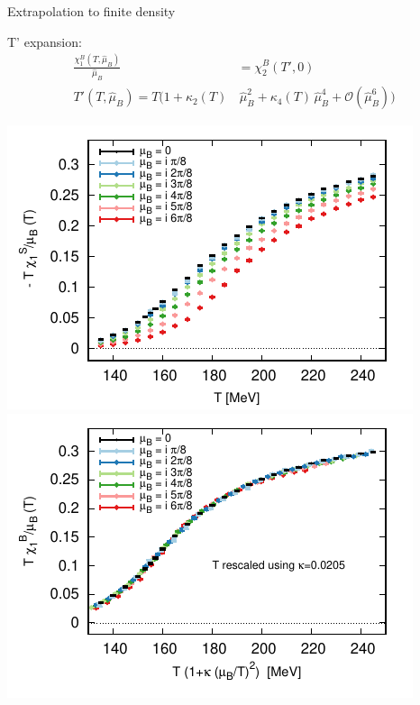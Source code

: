 \begin{frame}[fragile]{Extrapolation to finite density}
    \vspace{-0.2cm}
    \begin{block}{T' expansion:}
    \vspace{-0.2cm}
        \begin{align}
            \frac{\chi^B_1(T,\hat{\mu}_B)}{\hat{\mu}_B}&=\chi^B_2(T',0)\\
            T'(T,\hat{\mu}_B)=T\Big(1+\kappa_2(T)&\,\hat{\mu}_B^2+\kappa_4(T)\,\hat{\mu}_B^4+\mathcal{O}(\hat{\mu}_B^6)\Big)
        \end{align}
    \end{block}
    \vspace{0cm}
    \includegraphics[width=0.47\linewidth,trim={0 0 0 0.28cm}, clip]{Images/Figures/shift_48x12_BS.pdf}\hspace{0.5cm}\includegraphics[width=0.48\linewidth,trim={0 0 0 0}, clip]{Images/Figures/shift_48x12_B2_collapse.pdf}\\
    \vspace{-0.3cm}{\centering \scriptsize Phys. Rev. Lett. 126, 232001 (2021) \par}
\end{frame}
